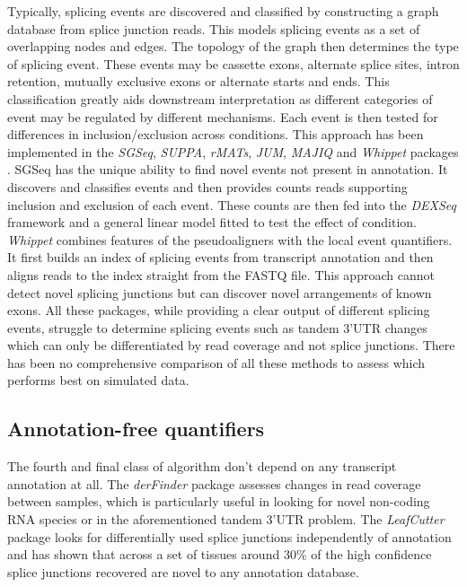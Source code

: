 Typically, splicing events are discovered and classified by constructing a graph database from splice junction reads.
This models splicing events as a set of overlapping nodes and edges. 
The topology of the graph then determines the type of splicing event.
These events may be cassette exons, alternate splice sites, intron retention, mutually exclusive exons or alternate starts and ends. 
This classification greatly aids downstream interpretation as different categories of event may be regulated by different mechanisms.
 Each event is then tested for differences in inclusion/exclusion across conditions. 
 This approach has been implemented in the \textit{SGSeq}, \textit{SUPPA}, \textit{rMATs}, \textit{JUM}, \textit{MAJIQ} and \textit{Whippet} packages \citep{Goldstein2016,Alamancos2015,Vaquero-Garcia2016,Wang2018a,Shen2014, Sterne-Weiler2018a}. 
SGSeq has the unique ability to find novel events not present in annotation. 
It discovers and classifies events and then provides counts reads supporting inclusion and exclusion of each event.
These counts are then fed into the \textit{DEXSeq} framework and a general linear model fitted to test the effect of condition. %
\textit{Whippet} combines features of the pseudoaligners with the local event quantifiers. 
It first builds an index of splicing events from transcript annotation and then aligns reads to the index straight from the FASTQ file. 
This approach cannot detect novel splicing junctions but can discover novel arrangements of known exons.
All these packages, while providing a clear output of different splicing events, struggle to determine splicing events such as tandem 3'UTR changes which can only be differentiated by read coverage and not splice junctions.
There has been no comprehensive comparison of all these methods to assess which performs best on simulated data.

\subsection{Annotation-free quantifiers}
The fourth and final class of algorithm don't depend on any transcript annotation at all. The \textit{derFinder} package \citep{Collado-Torres2017} assesses changes in read coverage between samples, which is particularly useful in looking for novel non-coding RNA species or in the aforementioned tandem 3'UTR problem. The \textit{LeafCutter} package \citep{Li2016} looks for differentially used splice junctions independently of annotation and has shown that across a set of tissues around 30\% of the high confidence splice junctions recovered are novel to any annotation database. 

